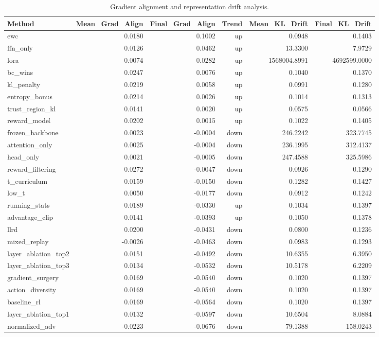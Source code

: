 \begin{table}[htbp]
\centering
\caption{Gradient alignment and representation drift analysis.}
\label{tab:gradient}
\begin{tabular}{lrrrrr}
\toprule
\textbf{Method} & \textbf{Mean_Grad_Align} & \textbf{Final_Grad_Align} & \textbf{Trend} & \textbf{Mean_KL_Drift} & \textbf{Final_KL_Drift} \\
\midrule
ewc & 0.0180 & 0.1002 & up & 0.0948 & 0.1403 \\
ffn_only & 0.0126 & 0.0462 & up & 13.3300 & 7.9729 \\
lora & 0.0074 & 0.0282 & up & 1568004.8991 & 4692599.0000 \\
bc_wins & 0.0247 & 0.0076 & up & 0.1040 & 0.1370 \\
kl_penalty & 0.0219 & 0.0058 & up & 0.0991 & 0.1280 \\
entropy_bonus & 0.0214 & 0.0026 & up & 0.1014 & 0.1313 \\
trust_region_kl & 0.0141 & 0.0020 & up & 0.0575 & 0.0566 \\
reward_model & 0.0202 & 0.0015 & up & 0.1022 & 0.1405 \\
frozen_backbone & 0.0023 & -0.0004 & down & 246.2242 & 323.7745 \\
attention_only & 0.0025 & -0.0004 & down & 236.1995 & 312.4137 \\
head_only & 0.0021 & -0.0005 & down & 247.4588 & 325.5986 \\
reward_filtering & 0.0272 & -0.0047 & down & 0.0926 & 0.1290 \\
t_curriculum & 0.0159 & -0.0150 & down & 0.1282 & 0.1427 \\
low_t & 0.0050 & -0.0177 & down & 0.0912 & 0.1242 \\
running_stats & 0.0189 & -0.0330 & up & 0.1034 & 0.1397 \\
advantage_clip & 0.0141 & -0.0393 & up & 0.1050 & 0.1378 \\
llrd & 0.0200 & -0.0431 & down & 0.0800 & 0.1236 \\
mixed_replay & -0.0026 & -0.0463 & down & 0.0983 & 0.1293 \\
layer_ablation_top2 & 0.0151 & -0.0492 & down & 10.6355 & 6.3950 \\
layer_ablation_top3 & 0.0134 & -0.0532 & down & 10.5178 & 6.2209 \\
gradient_surgery & 0.0169 & -0.0540 & down & 0.1020 & 0.1397 \\
action_diversity & 0.0169 & -0.0540 & down & 0.1020 & 0.1397 \\
baseline_rl & 0.0169 & -0.0564 & down & 0.1020 & 0.1397 \\
layer_ablation_top1 & 0.0132 & -0.0597 & down & 10.6504 & 8.0884 \\
normalized_adv & -0.0223 & -0.0676 & down & 79.1388 & 158.0243 \\
\bottomrule
\end{tabular}
\end{table}